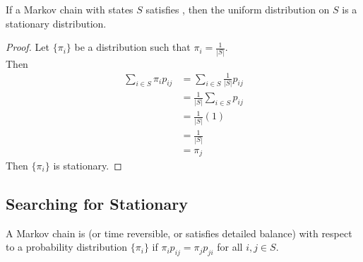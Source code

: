 \documentclass[11pt]{article}
\begin{document}
    \proposition
    If a Markov chain with states $S$ satisfies , then the uniform distribution on $S$ is a stationary distribution.
    \begin{proof}
    	Let $\{\pi_i\}$ be a distribution such that $\pi_i = \frac{1}{|S|}$. \\
    	Then
    	\begin{align*}
    		\sum_{i \in S}\pi_i p_{ij} &= \sum_{i \in S} \frac{1}{|S|}p_{ij} \\
    		&= \frac{1}{|S|}\sum_{i \in S} p_{ij} \\
    		&= \frac{1}{|S|}(1) \tag{doubly stochastic}\\
    		&= \frac{1}{|S|} \\
    		&= \pi_j
    	\end{align*}
    Then $\{\pi_i\}$ is stationary.
    \end{proof}
    
    \subsection{Searching for Stationary}
    A Markov chain is  (or time reversible, or satisfies detailed balance) with respect to a probability distribution $\{\pi_i\}$ if $\pi_ip_{ij} = \pi_jp_{ji}$ for all $i, j \in S$.
    
\end{document}

